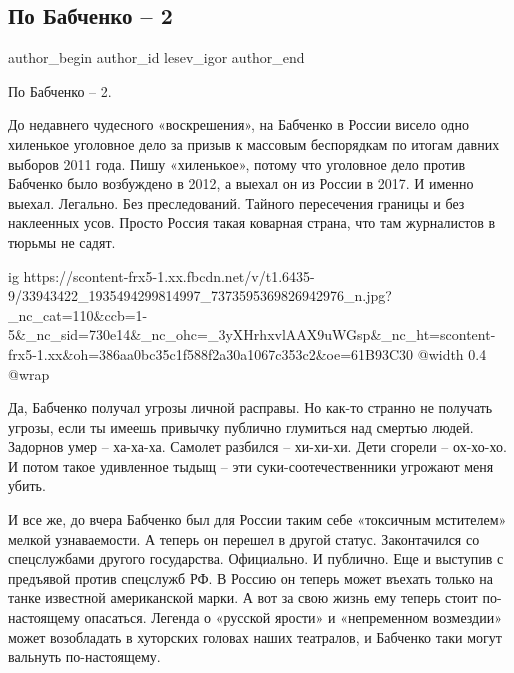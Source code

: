  
 
 
 
 
 
\subsection{По Бабченко – 2}
\label{sec:31_05_2018.fb.lesev_igor.1.babchenko_2}
 
\ifcmt
 author_begin
   author_id lesev_igor
 author_end
\fi

По Бабченко – 2.

До недавнего чудесного «воскрешения», на Бабченко в России висело одно
хиленькое уголовное дело за призыв к массовым беспорядкам по итогам давних
выборов 2011 года. Пишу «хиленькое», потому что уголовное дело против Бабченко
было возбуждено в 2012, а выехал он из России в 2017. И именно выехал.
Легально. Без преследований. Тайного пересечения границы и без наклеенных усов.
Просто Россия такая коварная страна, что там журналистов в тюрьмы не садят.

\ifcmt
  ig https://scontent-frx5-1.xx.fbcdn.net/v/t1.6435-9/33943422_1935494299814997_7373595369826942976_n.jpg?_nc_cat=110&ccb=1-5&_nc_sid=730e14&_nc_ohc=_3yXHrhxvlAAX9uWGsp&_nc_ht=scontent-frx5-1.xx&oh=386aa0bc35c1f588f2a30a1067c353c2&oe=61B93C30
  @width 0.4
  @wrap 
\fi

Да, Бабченко получал угрозы личной расправы. Но как-то странно не получать
угрозы, если ты имеешь привычку публично глумиться над смертью людей. Задорнов
умер – ха-ха-ха. Самолет разбился – хи-хи-хи. Дети сгорели – ох-хо-хо. И потом
такое удивленное тыдыщ – эти суки-соотечественники угрожают меня убить.

И все же, до вчера Бабченко был для России таким себе «токсичным мстителем»
мелкой узнаваемости. А теперь он перешел в другой статус. Законтачился со
спецслужбами другого государства. Официально. И публично. Еще и выступив с
предъявой против спецслужб РФ. В Россию он теперь может въехать только на танке
известной американской марки. А вот за свою жизнь ему теперь стоит
по-настоящему опасаться. Легенда о «русской ярости» и «непременном возмездии»
может возобладать в хуторских головах наших театралов, и Бабченко таки могут
вальнуть по-настоящему.

